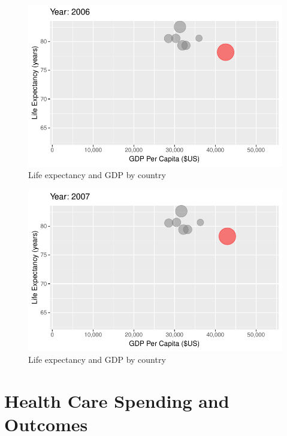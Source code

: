 \documentclass[
  letterpaper,
  DIV=11,
  numbers=noendperiod]{scrreport}
\theoremstyle{definition}
\theoremstyle{remark}
\begin{document}
\begin{figure}

{\centering \includegraphics{index_files/figure-pdf/fig-anim-country-99.pdf}

}

\caption{\label{fig-anim-country-99}Life expectancy and GDP by country}

\end{figure}

\begin{figure}

{\centering \includegraphics{index_files/figure-pdf/fig-anim-country-100.pdf}

}

\caption{\label{fig-anim-country-100}Life expectancy and GDP by country}

\end{figure}

\hypertarget{health-care-spending-and-outcomes}{%
\section*{Health Care Spending and
Outcomes}\label{health-care-spending-and-outcomes}}
\end{document}
